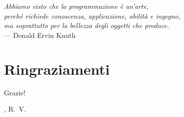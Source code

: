 
\cleardoublepage
{}
{}

\begin{flushright}{\slshape    
	Abbiamo visto che la programmazione è un'arte, \\
	perché richiede conoscenza, applicazione, abilità e ingegno, \\
	ma soprattutto per la bellezza degli oggetti che produce.} \\ \medskip
    --- Donald Ervin Knuth
\end{flushright}


\bigskip

\begingroup
\let\clearpage\relax
\let\cleardoublepage\relax
\let\cleardoublepage\relax

\chapter*{Ringraziamenti}

Grazie!

\bigskip
 
\noindent\textit{\myLocation, \myTime}
\hfill R.~V.

\endgroup

